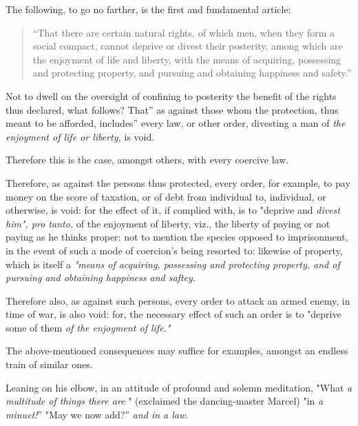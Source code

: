 \documentclass[12pt]{report}
\begin{document}
The following, to go no farther, is the first and fundamental article:\\

\begin{quote}
``That there are certain natural rights, of which men, when they form a
social compact, cannot deprive or divest their posterity, among which
are the enjoyment of life and liberty, with the means of acquiring,
possessing and protecting property, and pursuing and obtaining happiness
and safety.''
\end{quote}

Not to dwell on the oversight of confining to posterity the benefit of
the rights thus declared, what follows? That'' as against those
whom the protection, thus meant to be afforded, includes'' every
law, or other order, divesting a man of \emph{the enjoyment of life or
liberty,} is void.

Therefore this is the case, amongst others, with every coercive law.

Therefore, as against the persons thus protected, every order, for
example, to pay money on the score of taxation, or of debt from
individual to, individual, or otherwise, is void: for the effect of it,
if complied with, is to "deprive and \emph{divest him", pro tanto,} of
the enjoyment of liberty, viz., the liberty of paying or not paying as
he thinks proper: not to mention the species opposed to imprisonment, in
the event of such a mode of coercion's being resorted to: likewise of
property, which is itself a \emph{"means of acquiring, possessing and
protecting property, and of pursuing and obtaining happiness and
saftey.}

Therefore also, as against such persons, every order to attack an armed
enemy, in time of war, is also void: for, the necessary effect of such
an order is to "deprive some of them \emph{of the enjoyment of life."}

The above-mentioned consequences may suffice for examples, amongst an
endless train of similar ones.

Leaning on his elbow, in an attitude of profound and solemn meditation,
"What \emph{a multitude of things there are} " (exclaimed the
dancing-master Marcel) "in \emph{a minuet!}'' "May we now
add?'' \emph{and in a law.}
\end{document}
